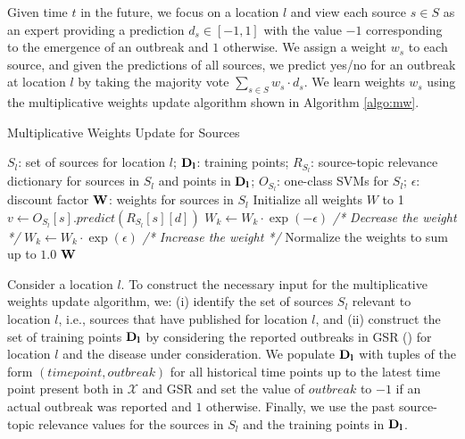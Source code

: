 \documentclass[conference]{IEEEtran}
\begin{document}
Given time $t$ in the future, we focus on a location $l$ and view each source $s \in S$ as an expert providing a prediction $d_s \in [-1,1]$ with the value $-1$ corresponding to the emergence of an outbreak and $1$ otherwise. We assign a weight $w_s$ to each source, and given the predictions of all sources, we predict yes/no for an outbreak at location $l$ by taking the majority vote $\sum_{s \in S} w_s \cdot d_s$.  We learn weights $w_s$ using the multiplicative weights update algorithm shown in Algorithm \ref{algo:mw}.

\begin{algorithm}[h]
\caption{Multiplicative Weights Update for Sources}
\begin{algorithmic}[1]
 $S_l$: set of sources for location $l$; ${\bf D_l}$: training points; $R_{S_l}$: source-topic relevance dictionary for sources in $S_l$ and points in ${\bf D_l}$; $O_{S_l}$: one-class SVMs for $S_l$; $\epsilon$: discount factor
 $\bf{W}$: weights for sources in $S_l$
\STATE Initialize all weights $W$ to 1
	\STATE $v \leftarrow O_{S_l}[s].predict(R_{S_l}[s][d])$
		\STATE  $W_k \leftarrow W_k\cdot \exp(-\epsilon)$ {\em /* Decrease the weight */}
	\ELSE
		\STATE $W_k \leftarrow W_k\cdot \exp(\epsilon)$ {\em /* Increase the weight */}
	\ENDIF
	\ENDFOR	
	\STATE Normalize the weights to sum up to $1.0$
\ENDFOR
\RETURN ${\bf W}$
\end{algorithmic}
\label{algo:mw}
\end{algorithm}

Consider a location $l$. To construct the necessary input for the multiplicative weights update algorithm, we: (i) identify the set of sources $S_l$ relevant to location $l$, i.e., sources that have published for location $l$, and (ii) construct the set of training points  ${\bf D_l}$ by considering the reported outbreaks in GSR () for location $l$ and the disease under consideration. We populate ${\bf D_l}$ with tuples of the form $(time point, outbreak)$ for all historical time points up to the latest time point present both in $\mathcal{X}$ and GSR and set the value of $outbreak$ to $-1$ if an actual outbreak was reported and $1$ otherwise. Finally, we use the past source-topic relevance values for the sources in $S_l$ and the training points in ${\bf D_l}$.
\end{document}

